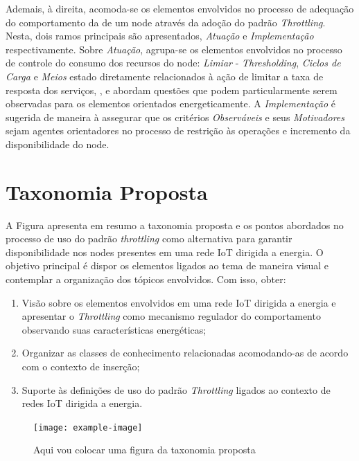 Ademais, à direita, acomoda-se os elementos envolvidos no processo de adequação do comportamento da de um node através da adoção do padrão \textit{Throttling}. Nesta, dois ramos principais são apresentados, \textit{Atuação} e \textit{Implementação} respectivamente. Sobre \textit{Atuação}, agrupa-se os elementos envolvidos no processo de controle do consumo dos recursos do node: \textit{Limiar} - \textit{Thresholding}, \textit{Ciclos de Carga} e \textit{Meios} estado diretamente relacionados à ação de limitar a taxa de resposta dos serviços,  \cite{khairnar_discrete-rate_2015}, \cite{khan_energy_2015} e \cite{sudevalayam_energy_2011} abordam questões que podem particularmente serem observadas para os elementos orientados energeticamente. A \textit{Implementação} é sugerida de maneira à assegurar que os critérios  \textit{Observáveis} e seus \textit{Motivadores} sejam agentes orientadores no processo de restrição às operações e incremento da disponibilidade do node. 


\section{Taxonomia Proposta}
A Figura apresenta em resumo a taxonomia proposta e os pontos abordados no processo de uso do padrão \textit{throttling} como alternativa para garantir disponibilidade nos nodes presentes em uma rede \acs{IoT} dirigida a energia. O objetivo principal é dispor os elementos ligados ao tema de maneira visual e contemplar a organização dos tópicos envolvidos. Com isso, obter:

\begin{enumerate}
    \item Visão sobre os elementos envolvidos em uma rede \acs{IoT} dirigida a energia e apresentar o \textit{Throttling} como mecanismo regulador do comportamento observando suas características energéticas;
    \item Organizar as classes de conhecimento relacionadas acomodando-as de acordo com o contexto de inserção;
    \item Suporte às definições de uso do padrão \textit{Throttling} ligados ao contexto de redes \acs{IoT} dirigida a energia. 
\end{enumerate}

\begin{figure}[h]
\noindent\texttt{[image: example-image]} 
\caption{Aqui vou colocar uma figura da taxonomia proposta}
\label{fig:taxonomia_detalhada}
\centering
\end{figure}

